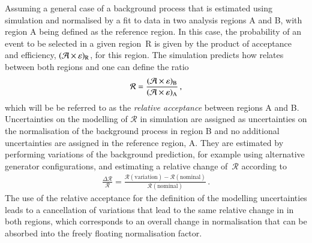 Assuming a general case of a background process that is estimated using
simulation and normalised by a fit to data in two analysis regions A and B, with
region A being defined as the reference region. In this case, the probability of
an event to be selected in a given region~R is given by the product of
acceptance and efficiency, $(\mathcal{A} \times \varepsilon)_{\text{R}}$, for this region. The
simulation predicts how \AccTimesEff relates between both regions and one can
define the ratio
\begin{align*}
  \mathcal{R} = \frac{(\mathcal{A} \times \varepsilon)_{\text{B}}}{(\mathcal{A} \times \varepsilon)_{\text{A}}} \,\text{,}
\end{align*}
which will be be referred to as the \emph{relative acceptance} between regions A
and B. Uncertainties on the modelling of $\mathcal{R}$ in simulation are
assigned as uncertainties on the normalisation of the background process in
region B and no additional uncertainties are assigned
in the reference region, A. They are estimated by performing variations of the
background prediction, for example using alternative generator configurations,
and estimating a relative change of~$\mathcal{R}$ according to
\begin{align}
  \frac{\Delta \mathcal{R}}{\mathcal{R}} = \frac{\mathcal{R}(\text{variation}) - \mathcal{R}(\text{nominal})}{\mathcal{R}(\text{nominal})} \,\text{.}
  \label{eq:relative_acceptance_uncertainty}
\end{align}
The use of the relative acceptance for the definition of the modelling
uncertainties leads to a cancellation of variations that lead to the same
relative change in \AccTimesEff in both regions, which corresponds to an overall
change in normalisation that can be absorbed into the freely floating
normalisation factor.



